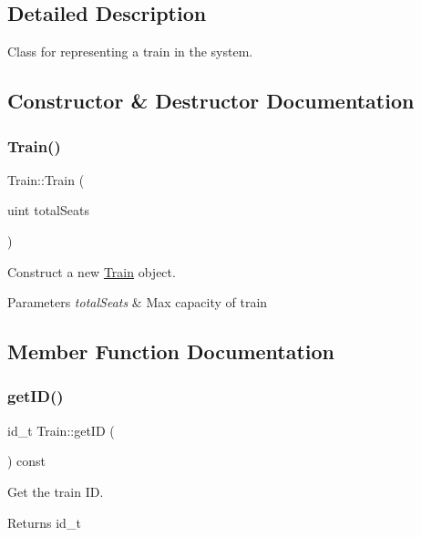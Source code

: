\subsection{Detailed Description}
Class for representing a train in the system. 

\subsection{Constructor \& Destructor Documentation}
\mbox{\label{classTrain_aa965be5e5d076d2743301c5d75ce4401}} 
\subsubsection{\texorpdfstring{Train()}{Train()}}
{\footnotesize\ttfamily Train\+::\+Train (\begin{DoxyParamCaption}\item[{uint}]{total\+Seats }\end{DoxyParamCaption})}



Construct a new \mbox{\hyperlink{classTrain}{Train}} object. 


\begin{DoxyParams}{Parameters}
{\em total\+Seats} & Max capacity of train \\
\hline
\end{DoxyParams}


\subsection{Member Function Documentation}
\mbox{\label{classTrain_a7310ae0bc5b43ea392e4fa62630ee56b}} 
\subsubsection{\texorpdfstring{get\+I\+D()}{getID()}}
{\footnotesize\ttfamily id\+\_\+t Train\+::get\+ID (\begin{DoxyParamCaption}{ }\end{DoxyParamCaption}) const}



Get the train ID. 

\begin{DoxyReturn}{Returns}
id\+\_\+t 
\end{DoxyReturn}
\mbox{\label{classTrain_a93cd372664bac4ba28fa36e40316444a}} 
